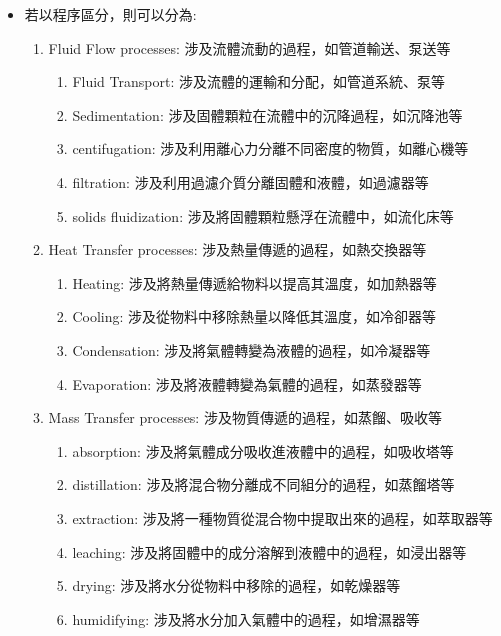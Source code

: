 \documentclass[../main.tex]{subfiles}
\begin{document}
\begin{itemize}
\begin{enumerate}
\begin{itemize}
      \item Heat Exchangers: 用於在不同流體之間傳遞熱量的設備
    \end{itemize}
    \item 攪拌器(Mixer): 用於混合不同物料的設備
  \end{enumerate}
  \item 若以程序區分，則可以分為:
  \begin{enumerate}
    \item Fluid Flow processes: 涉及流體流動的過程，如管道輸送、泵送等
    \begin{enumerate}
      \item Fluid Transport: 涉及流體的運輸和分配，如管道系統、泵等
      \item Sedimentation: 涉及固體顆粒在流體中的沉降過程，如沉降池等
      \item centifugation: 涉及利用離心力分離不同密度的物質，如離心機等
      \item filtration: 涉及利用過濾介質分離固體和液體，如過濾器等
      \item solids fluidization: 涉及將固體顆粒懸浮在流體中，如流化床等
    \end{enumerate}
    \item Heat Transfer processes: 涉及熱量傳遞的過程，如熱交換器等
    \begin{enumerate}
      \item Heating: 涉及將熱量傳遞給物料以提高其溫度，如加熱器等
      \item Cooling: 涉及從物料中移除熱量以降低其溫度，如冷卻器等
      \item Condensation: 涉及將氣體轉變為液體的過程，如冷凝器等
      \item Evaporation: 涉及將液體轉變為氣體的過程，如蒸發器等
    \end{enumerate}
    \item Mass Transfer processes: 涉及物質傳遞的過程，如蒸餾、吸收等
    \begin{enumerate}
      \item absorption: 涉及將氣體成分吸收進液體中的過程，如吸收塔等
      \item distillation: 涉及將混合物分離成不同組分的過程，如蒸餾塔等
      \item extraction: 涉及將一種物質從混合物中提取出來的過程，如萃取器等
      \item leaching: 涉及將固體中的成分溶解到液體中的過程，如浸出器等
      \item drying: 涉及將水分從物料中移除的過程，如乾燥器等
      \item humidifying: 涉及將水分加入氣體中的過程，如增濕器等

\end{enumerate}
\end{enumerate}
\end{itemize}
\end{document}
